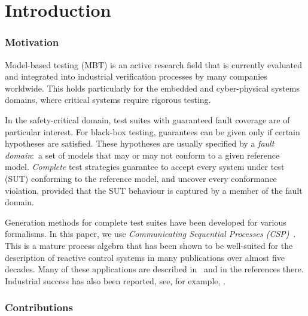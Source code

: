 
\section{Introduction}
\label{sec:intro}


\subsubsection*{Motivation}

Model-based testing (MBT) is an  active research field that is currently
evaluated and integrated into industrial verification processes by many
companies worldwide. This holds particularly for the embedded and
cyber-physical systems domains, where critical systems require rigorous
testing.

In the safety-critical domain, test suites with guaranteed fault coverage are
of particular interest. For black-box testing, guarantees can be given only
if certain hypotheses are satisfied. These hypotheses are usually specified
by a \emph{fault domain}:~a set of models that may or may not conform to a
given reference model. \emph{Complete} test strategies guarantee to accept
every  system under test (SUT) conforming to the reference model, and uncover
every conformance violation, provided that the SUT behaviour is captured by a
member of the fault domain.

Generation methods for complete test suites have been developed for various
formalisms. In this paper, we use \emph{Communicating Sequential Processes
(CSP)}~\cite{Hoare:1985:CSP:3921,Roscoe2010}. This is a mature process
algebra that has been shown to be well-suited for the description of reactive
control systems in many publications over almost five decades. Many of these
applications are described in~\cite{Roscoe2010} and in the references there.
Industrial success has also been reported, see, for example,
\cite{976937,DBLP:conf/prdc/ShiPK99,DBLP:conf/amast/ButhKPS97}.


\subsubsection*{Contributions}

